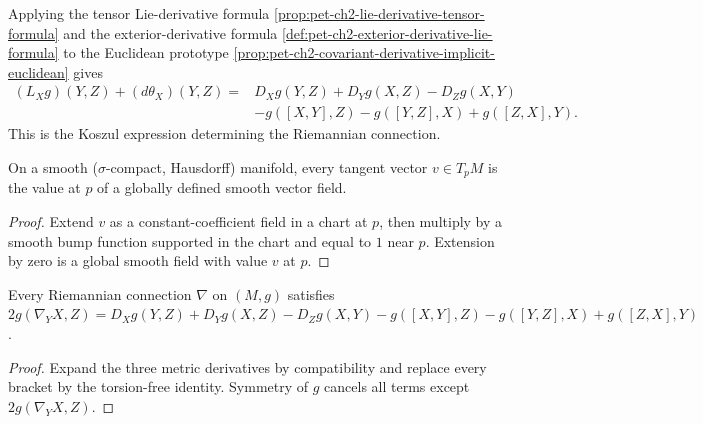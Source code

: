 \begin{remark}
  \label{rem:pet-ch2-koszul-formula}


  Applying the tensor Lie-derivative formula
  \cref{prop:pet-ch2-lie-derivative-tensor-formula} and the exterior-derivative
  formula \cref{def:pet-ch2-exterior-derivative-lie-formula} to the Euclidean
  prototype \cref{prop:pet-ch2-covariant-derivative-implicit-euclidean} gives
  \[
  \begin{aligned}
    (L_Xg)(Y,Z)+(d\theta_X)(Y,Z)
      ={}&D_Xg(Y,Z)+D_Yg(X,Z)-D_Zg(X,Y)\\
         &-g([X,Y],Z)-g([Y,Z],X)+g([Z,X],Y).
  \end{aligned}
  \]
  This is the Koszul expression determining the Riemannian connection.
\end{remark}


\begin{lemma}
  \label{lem:pet-ch2-extend-tangent-vector}


  On a smooth ($\sigma$-compact, Hausdorff) manifold, every tangent vector
  $v\in T_pM$ is the value at $p$ of a globally defined smooth vector field.
\end{lemma}
\begin{proof}

  \sketch
  Extend $v$ as a constant-coefficient
  field in a chart at $p$, then multiply by a smooth bump function supported
  in the chart and equal to $1$ near $p$. Extension by zero is a global
  smooth field with value $v$ at $p$.
\end{proof}

\begin{lemma}
  \label{lem:pet-ch2-riemannian-connection-koszul}


  Every Riemannian connection $\nabla$ on $(M,g)$ satisfies
  $2g(\nabla_YX,Z)=D_Xg(Y,Z)+D_Yg(X,Z)-D_Zg(X,Y)
  -g([X,Y],Z)-g([Y,Z],X)+g([Z,X],Y)$.
\end{lemma}
\begin{proof}

  \sketch
  Expand the three metric
  derivatives by compatibility and replace every bracket by the
  torsion-free identity. Symmetry of $g$ cancels all terms except
  $2g(\nabla_YX,Z)$.
\end{proof}

